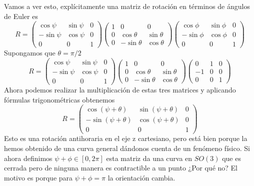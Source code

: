 \documentclass[12pt]{article}
\begin{document}
Vamos a ver esto, explícitamente una matriz de rotación en términos de ángulos de Euler es
\begin{equation}
   R= \begin{pmatrix}
        \cos \psi & \sin \psi & 0 \\ 
        -\sin \psi & \cos \psi  & 0 \\
        0 & 0 & 1 
    \end{pmatrix}     \begin{pmatrix}
        1 & 0&0 \\
        0 & \cos\theta & \sin\theta \\
        0&-\sin\theta & \cos \theta
    \end{pmatrix} \begin{pmatrix}
        \cos \phi & \sin \phi & 0 \\ 
        -\sin \phi & \cos \phi  & 0 \\
        0 & 0 & 1 
    \end{pmatrix}
\end{equation}
Supongamos que $\theta=\pi/2$ 
\begin{equation}
   R= \begin{pmatrix}
        \cos \psi & \sin \psi & 0 \\ 
        -\sin \psi & \cos \psi  & 0 \\
        0 & 0 & 1 
    \end{pmatrix}     \begin{pmatrix}
        1 & 0&0 \\
        0 & \cos\theta & \sin\theta \\
        0&-\sin\theta & \cos \theta
    \end{pmatrix} \begin{pmatrix}
        0 & 1 & 0 \\ 
        -1 & 0  & 0 \\
        0 & 0 & 1 
    \end{pmatrix}
\end{equation}
Ahora podemos realizar la multiplicación de estas tres matrices y aplicando fórmulas trigonométricas obtenemos
\begin{equation}
R =
\begin{pmatrix}
\cos(\psi + \theta) & \sin(\psi + \theta) & 0 \\
-\sin(\psi + \theta) & \cos(\psi + \theta) & 0 \\
0 & 0 & 1
\end{pmatrix}
\end{equation}
Esto es una rotación antihoraria en el eje z cartesiano, pero está bien porque la hemos obtenido de una curva general dándonos cuenta de un fenómeno físico.  Si ahora definimos $\psi +\phi \in[0,2\pi]$ esta matriz da una curva en $SO(3)$ que es cerrada pero de ninguna manera es contractible a un punto ¿Por qué no? El motivo es porque para $\psi +\phi =\pi$ la orientación cambia.
\end{document}
